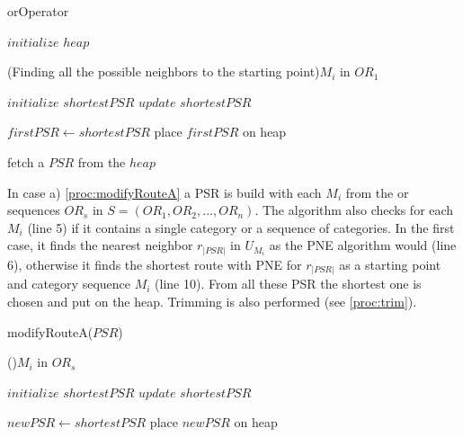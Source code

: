 \begin{algorithm}[H]
	\label{alg:or}
	\caption{orOperator}
	
	\BlankLine
	
	$initialize$ $heap$\; 
	
	\ForEach(Finding all the possible neighbors to the starting point){$M_i$ in $OR_1$}{
		$initialize$ $shortestPSR$\;
		{
			\;
			$update$ $shortestPSR$\;
		}	
		
	}
	$firstPSR \leftarrow shortestPSR$\;
	place $firstPSR$ on heap\;
	
	\BlankLine
	
	
	fetch a $PSR$ from the $heap$\;

\end{algorithm}

In case a) \ref{proc:modifyRouteA} a PSR is build with each $M_i$ from the or sequences $OR_s$ in $S = (OR_1, OR_2, ..., OR_n)$. The algorithm also checks for each $M_i$ (line 5) if it contains a single category or a sequence of categories. In the first case, it finds the nearest neighbor $r_{|PSR|}$ in $U_{M_{i}}$ as the PNE algorithm would (line 6), otherwise it finds the shortest route with PNE for $r_{|PSR|}$ as a starting point and category sequence $M_i$ (line 10). From all these PSR the shortest one is chosen and put on the heap. Trimming is also performed (see \ref{proc:trim}).

\begin{procedure}[H]
	\label{proc:modifyRouteA}
	\caption{modifyRouteA($PSR$)}
	\ForEach(){$M_i$ in $OR_s$}{
		$initialize$ $shortestPSR$\;
		{
			\;
			$update$ $shortestPSR$\;
		}	
		
	}
	$newPSR \leftarrow shortestPSR$\;
	place $newPSR$ on heap\;
\end{procedure}

